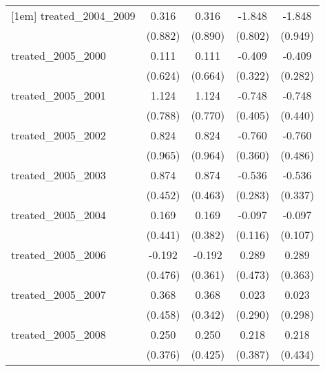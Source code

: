 {\begin{tabular}{l*{4}{c}}
[1em]
treated\_2004\_2009&       0.316         &       0.316         &      -1.848\sym{*}  &      -1.848         \\
            &     (0.882)         &     (0.890)         &     (0.802)         &     (0.949)         \\
[1em]
treated\_2005\_2000&       0.111         &       0.111         &      -0.409         &      -0.409         \\
            &     (0.624)         &     (0.664)         &     (0.322)         &     (0.282)         \\
[1em]
treated\_2005\_2001&       1.124         &       1.124         &      -0.748         &      -0.748         \\
            &     (0.788)         &     (0.770)         &     (0.405)         &     (0.440)         \\
[1em]
treated\_2005\_2002&       0.824         &       0.824         &      -0.760\sym{*}  &      -0.760         \\
            &     (0.965)         &     (0.964)         &     (0.360)         &     (0.486)         \\
[1em]
treated\_2005\_2003&       0.874         &       0.874         &      -0.536         &      -0.536         \\
            &     (0.452)         &     (0.463)         &     (0.283)         &     (0.337)         \\
[1em]
treated\_2005\_2004&       0.169         &       0.169         &      -0.097         &      -0.097         \\
            &     (0.441)         &     (0.382)         &     (0.116)         &     (0.107)         \\
[1em]
treated\_2005\_2006&      -0.192         &      -0.192         &       0.289         &       0.289         \\
            &     (0.476)         &     (0.361)         &     (0.473)         &     (0.363)         \\
[1em]
treated\_2005\_2007&       0.368         &       0.368         &       0.023         &       0.023         \\
            &     (0.458)         &     (0.342)         &     (0.290)         &     (0.298)         \\
[1em]
treated\_2005\_2008&       0.250         &       0.250         &       0.218         &       0.218         \\
            &     (0.376)         &     (0.425)         &     (0.387)         &     (0.434)         \\

\end{tabular}}
